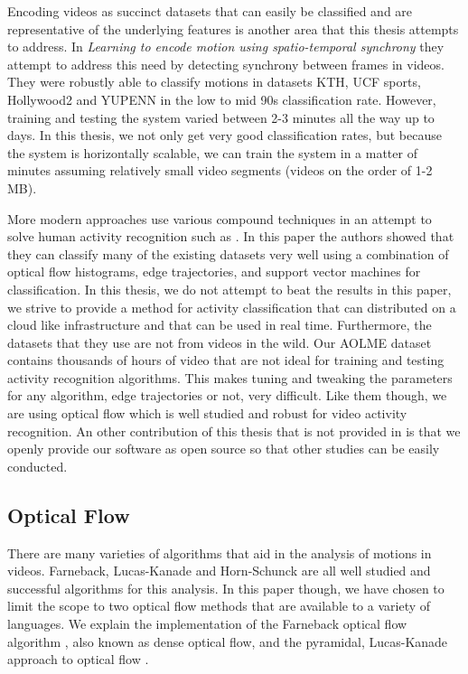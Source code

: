 Encoding videos as succinct datasets that can easily be classified and are
representative of the underlying features is another area that this thesis
attempts to address. In \textit{Learning to encode motion using spatio-temporal
synchrony} \cite{konda2013learning} they attempt to address this need by detecting
synchrony between frames in videos. They were robustly able to classify motions in
datasets KTH, UCF sports, Hollywood2 and YUPENN in the low to mid 90s classification
rate. However, training and testing the system varied between 2-3 minutes all
the way up to days. In this thesis, we not only get very good classification
rates, but because the system is horizontally scalable, we can train the system
in a matter of minutes assuming relatively small video segments (videos on the
order of 1-2 MB).

More modern approaches use various compound techniques in an attempt to solve
human activity recognition such as \cite{wang2016action}. In this paper the
authors showed that they can classify many of the existing datasets very well
using a combination of optical flow histograms, edge trajectories, and support
vector machines for classification. In this thesis, we do not attempt to beat
the results in this paper, we strive to provide a method for activity
classification that can distributed on a cloud like infrastructure and that can
be used in real time. Furthermore, the datasets that they use are not from
videos in the wild. Our AOLME dataset contains thousands of hours of video that
are not ideal for training and testing activity recognition algorithms. This
makes tuning and tweaking the parameters for any algorithm, edge trajectories or
not, very difficult. Like them though, we are using optical flow which is well
studied and robust for video activity recognition. An other contribution of this
thesis that is not provided in \cite{wang2016action} is that we openly provide
our software as open source so that other studies can be easily conducted.



\subsection{\label{section:optical_flow}Optical Flow}
There are many varieties of algorithms that aid in the analysis of motions in
videos.  Farneback, Lucas-Kanade and Horn-Schunck \cite{horn1981determining} are
all well studied and successful algorithms for this analysis. In this paper
though, we have chosen to limit the scope to two optical flow methods that are
available to a variety of languages. We explain the implementation of the
Farneback optical flow algorithm \cite{farneback2003two}, also known as dense
optical flow, and the pyramidal, Lucas-Kanade approach to optical flow
\cite{bouguet2001pyramidal}.

